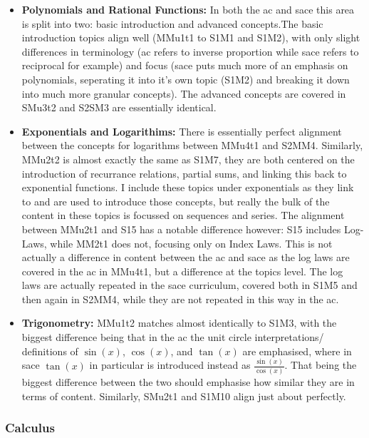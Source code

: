 \documentclass[twoside,12pt,a4paper]{report}
\begin{document}
\begin{itemize}
	\item \textbf{Polynomials and Rational Functions:} In both the \gls{ac} and \gls{sace} this area is split into two: basic introduction and advanced concepts.The basic introduction topics align well (MMu1t1 to S1M1 and S1M2), with only slight differences in terminology (\gls{ac} refers to inverse proportion while \gls{sace} refers to reciprocal for example) and focus (\gls{sace} puts much more of an emphasis on polynomials, seperating it into it's own topic (S1M2) and breaking it down into much more granular concepts). The advanced concepts are covered in SMu3t2 and S2SM3 are essentially identical.
	\item \textbf{Exponentials and Logarithims:} There is essentially perfect alignment between the concepts for logarithms between MMu4t1 and S2MM4. Similarly, MMu2t2 is almost exactly the same as S1M7, they are both centered on the introduction of recurrance relations, partial sums, and linking this back to exponential functions. I include these topics under exponentials as they link to and are used to introduce those concepts, but really the bulk of the content in these topics is focussed on sequences and series. The alignment between MMu2t1 and S15 has a notable difference however: S15 includes Log-Laws, while MM2t1 does not, focusing only on Index Laws. This is not actually a difference in content between the \gls{ac} and \gls{sace} as the log laws are covered in the \gls{ac} in MMu4t1, but a difference at the topics level. The log laws are actually repeated in the \gls{sace} curriculum, covered both in S1M5 and then again in S2MM4, while they are not repeated in this way in the \gls{ac}.
			\item \textbf{Trigonometry:} MMu1t2 matches almost identically to S1M3, with the biggest difference being that in the \gls{ac} the unit circle interpretations/ definitions of $\sin(x)$, $\cos(x)$, and $\tan(x)$ are emphasised, where in \gls{sace} $\tan(x)$ in particular is introduced instead as $\frac{\sin(x)}{\cos(x)}$. That being the biggest difference between the two should emphasise how similar they are in terms of content. Similarly, SMu2t1 and S1M10 align just about perfectly. 
\end{itemize}

\subsubsection{Calculus}
\end{document}
